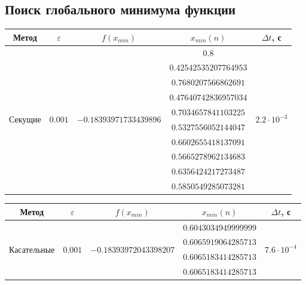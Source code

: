 \documentclass[a4paper,12pt]{extarticle}
\begin{document}
    \newpage
    \subsection{Поиск глобального минимума функции}



    \begin{center}
        \begin{tabular}{ |c|c|c|c|c| }
            \hline
            Метод & $\varepsilon$ & $f(x_{min})$ & $x_{min}(n)$ & $\Delta t$, с \\
            \hline
            \multirow{10}{9em}{\centerline{Секущие}} & \multirow{10}{5em}{\centerline{$0.001$}} 		  & \multirow{10}{10em}{\centerline{$-0.18393971733439896$}} &  		       $0.8$ & \multirow{10}{5em}{\centerline{$2.2\cdot 10^{-3}$}} \\
            &  		  &  & $0.42542535207764953$ &  \\
            & 		  &  & $0.7680207566862691$ &  \\
            &  		  &  & $0.47640742836957034$ &  \\
            &  		  &  & $0.7034657841103225$ &  \\
            &  		  &  & $0.5327556052144047$ &  \\
            & 		  &  & $0.6602655418137091$ &  \\
            &  		  &  & $0.5665278962134683$ &  \\
            &  		  &  & $0.6356424217273487$ &  \\
            &  		  &  & $0.5850549285073281$ &  \\
            \hline
        \end{tabular}
    \end{center}

    \begin{center}
        \begin{tabular}{ |c|c|c|c|c| }
            \hline
            Метод & $\varepsilon$ & $f(x_{min})$ & $x_{min}(n)$ & $\Delta t$, с \\
            \hline
            \multirow{4}{9em}{\centerline{Касательные}} & \multirow{4}{5em}{\centerline{$0.001$}} 		  & \multirow{4}{10em}{\centerline{$-0.18393972043398207$}} &  		       $0.6043034949999999$ & \multirow{4}{5em}{\centerline{$7.6\cdot 10^{-4}$}} \\
            &  		  &  & $0.6065919064285713$ &  \\
            & 		  &  & $0.6065183414285713$ &  \\
            &  		  &  & $0.6065183414285713$ & \\
            \hline
        \end{tabular}
    \end{center}

    \vspace{1in}
    \centering{\LaTeX}
\end{document}
